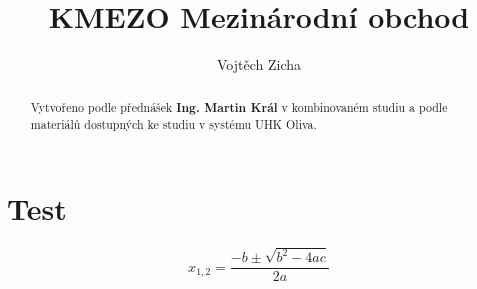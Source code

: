 \documentclass[twoside,12pt]{article}
\title{KMEZO Mezinárodní obchod}
\author{Vojtěch Zicha}
\begin{document}
\maketitle\thispagestyle{uhk}

\begin{abstract}
Vytvořeno podle přednášek \textbf{Ing. Martin Král} v kombinovaném studiu a podle materiálů dostupných ke studiu v systému UHK Oliva.
\end{abstract}

\tableofcontents

\section{Test}

\[ x_{1,2}=\frac{-b\pm\sqrt{b^2-4ac}}{2a} \]
\end{document}
